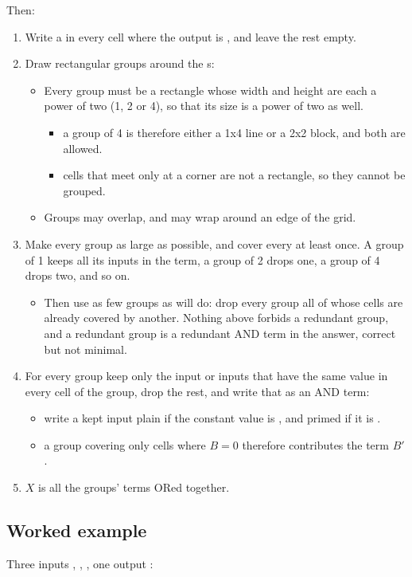 Then:
\begin{enumerate}
  \item Write a  in every cell where the output is , and leave the rest empty.
  \item Draw rectangular groups around the s:
  \begin{itemize}
    \item Every group must be a rectangle whose width and height are each a power of two
      (1, 2 or 4), so that its size is a power of two as well.
    \begin{itemize}
      \item a group of 4 is therefore either a 1x4 line or a 2x2 block, and both are allowed.
      \item cells that meet only at a corner are not a rectangle, so they cannot be grouped.
    \end{itemize}
    \item Groups may overlap, and may wrap around an edge of the grid.
  \end{itemize}
  \item Make every group as large as possible, and cover every  at least once. A group of 1
    keeps all its inputs in the term, a group of 2 drops one, a group of 4 drops two, and so on.
  \begin{itemize}
    \item Then use as few groups as will do: drop every group all of whose cells are already
      covered by another. Nothing above forbids a redundant group, and a redundant group is a
      redundant AND term in the answer, correct but not minimal.
  \end{itemize}
  \item For every group keep only the input or inputs that have the same value in every cell of the
    group, drop the rest, and write that as an AND term:
  \begin{itemize}
    \item write a kept input plain if the constant value is , and primed if it is .
    \item a group covering only cells where $B = 0$ therefore contributes the term $B'$.
  \end{itemize}
  \item $X$ is all the groups' terms ORed together.
\end{enumerate}

\subsection*{Worked example}
Three inputs , , , one output :

